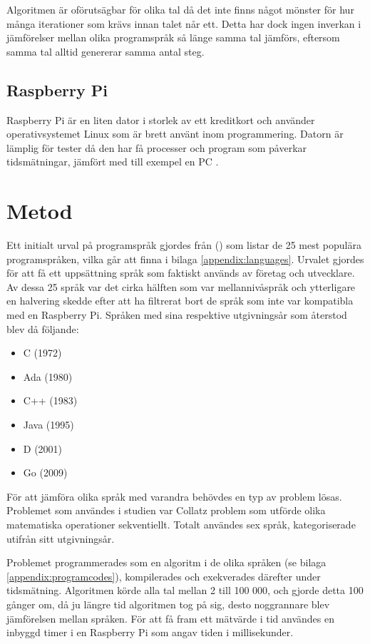 \documentclass[12pt,swedish]{article}
\begin{document}
Algoritmen är oförutsägbar för olika tal då det inte finns något mönster för hur många iterationer som krävs innan talet når ett. Detta har dock ingen inverkan i jämförelser mellan olika programspråk så länge samma tal jämförs, eftersom samma tal alltid genererar samma antal steg.

\subsection{Raspberry Pi}
Raspberry Pi är en liten dator i storlek av ett kreditkort och använder operativsystemet Linux som är brett använt inom programmering. Datorn är lämplig för tester då den har få processer och program som påverkar tidsmätningar, jämfört med till exempel en PC  \citep{andrews_2013}.


\newpage
\section{Metod}
Ett initialt urval på programspråk gjordes från  (\citeyear{tiobe}) som listar de 25 mest populära programspråken, vilka går att finna i bilaga \ref{appendix:languages}. Urvalet gjordes för att få ett uppsättning språk som faktiskt används av företag och utvecklare. Av dessa 25 språk var det cirka hälften som var mellannivåspråk och ytterligare en halvering skedde efter att ha filtrerat bort de språk som inte var kompatibla med en Raspberry Pi. Språken med sina respektive utgivningsår som återstod blev då följande:

\begin{itemize}
    \item C (1972)
    \item Ada (1980)
    \item C++ (1983)
    \item Java (1995)
    \item D (2001)
    \item Go (2009)
\end{itemize}
För att jämföra olika språk med varandra behövdes en typ av problem lösas. Problemet som användes i studien var Collatz problem som utförde olika matematiska operationer sekventiellt. Totalt användes sex språk, kategoriserade utifrån sitt utgivningsår.

Problemet programmerades som en algoritm i de olika språken (se bilaga \ref{appendix:programcodes}), kompilerades och exekverades därefter under tidsmätning. Algoritmen körde alla tal mellan 2 till 100 000, och gjorde detta 100 gånger om, då ju längre tid algoritmen tog på sig, desto noggrannare blev jämförelsen mellan språken. För att få fram ett mätvärde i tid användes en inbyggd timer i en Raspberry Pi som angav tiden i millisekunder.
\end{document}
